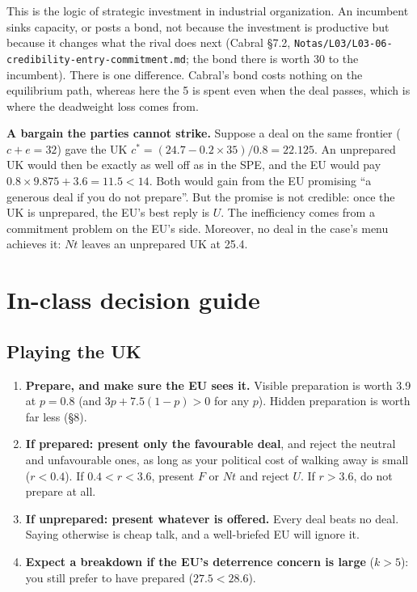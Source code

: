 \documentclass[11pt,a4paper]{article}
\newcommand{\Nt}{\mathit{Nt}}
\newcommand{\dF}{\mathit{F}}
\newcommand{\dU}{\mathit{U}}
\begin{document}
This is the logic of strategic investment in industrial organization. An incumbent sinks capacity,
or posts a bond, not because the investment is productive but because it changes what the rival
does next (Cabral \S7.2, \texttt{Notas/L03/L03-06-credibility-entry-commitment.md}; the bond there
is worth 30 to the incumbent). There is one difference. Cabral's bond costs nothing on the
equilibrium path, whereas here the 5 is spent even when the deal passes, which is where the
deadweight loss comes from.

\textbf{A bargain the parties cannot strike.} Suppose a deal on the same frontier ($c+e=32$) gave the
UK $c^*=(24.7-0.2\times35)/0.8=22.125$. An unprepared UK would then be exactly as well off as in the
SPE, and the EU would pay $0.8\times9.875+3.6=11.5<14$. Both would gain from the EU promising
``a generous deal if you do not prepare''. But the promise is not credible: once the UK is
unprepared, the EU's best reply is $\dU$. The inefficiency comes from a commitment problem on the EU's
side. Moreover, no deal in the case's menu achieves it: $\Nt$ leaves an unprepared UK at 25.4.

\section{In-class decision guide}

\subsection*{Playing the UK}
\begin{enumerate}
  \item \textbf{Prepare, and make sure the EU sees it.} Visible preparation is worth 3.9 at
    $p=0.8$ (and $3p+7.5(1-p)>0$ for any $p$). Hidden preparation is worth far less (\S8).
  \item \textbf{If prepared: present only the favourable deal}, and reject the neutral and
    unfavourable ones, as long as your political cost of walking away is small ($r<0.4$).
    If $0.4<r<3.6$, present $\dF$ or $\Nt$ and reject $\dU$. If $r>3.6$, do not prepare at all.
  \item \textbf{If unprepared: present whatever is offered.} Every deal beats no deal. Saying
    otherwise is cheap talk, and a well-briefed EU will ignore it.
  \item \textbf{Expect a breakdown if the EU's deterrence concern is large} ($k>5$): you still
    prefer to have prepared ($27.5<28.6$).
\end{enumerate}
\end{document}
